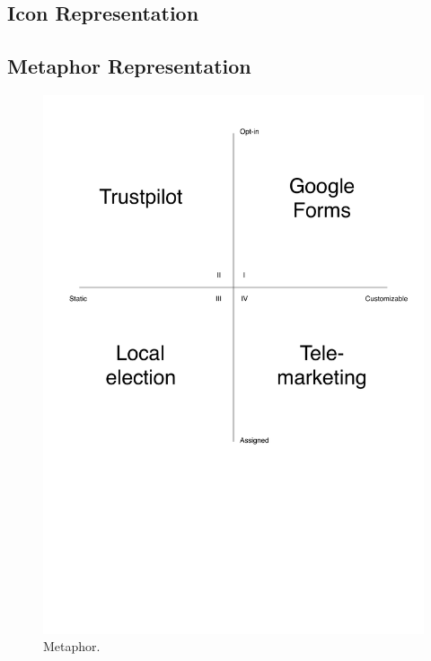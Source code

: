 


\subsection{Icon Representation}
\label{sub:icon_representation}


\subsection{Metaphor Representation}
\label{sub:metaphor_representation}

\begin{figure}[!htbp]
    \centering
    \includegraphics[width=\textwidth]{graphic/problem_analysis/vision/metaphor.pdf}
    \caption{Metaphor.}
    \label{fig:metaphor}
\end{figure}
\FloatBarrier

